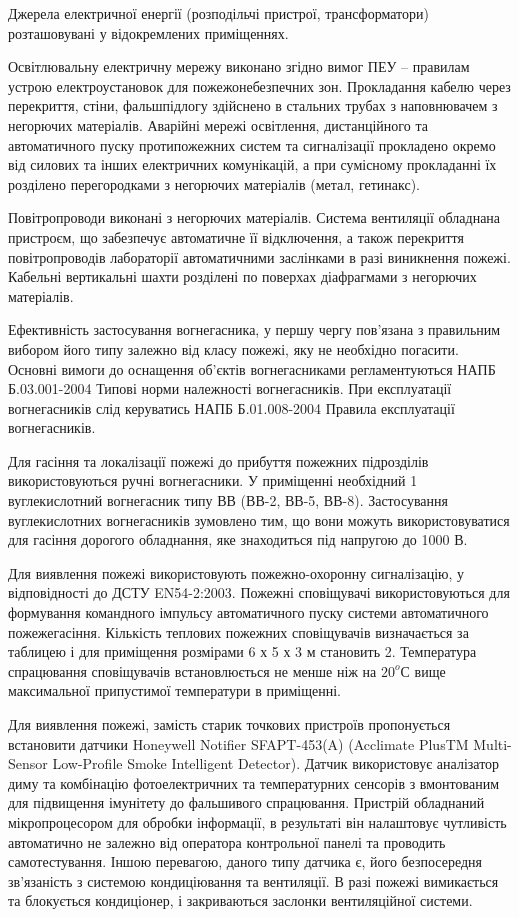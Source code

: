 Джерела електричної енергії (розподільчі пристрої, трансформатори) розташовувані у відокремлених приміщеннях.

Освітлювальну електричну мережу виконано згідно вимог ПЕУ – правилам устрою електроустановок для пожежонебезпечних зон.
Прокладання кабелю через перекриття, стіни, фальшпідлогу здійснено в стальних трубах з наповнювачем з негорючих матеріалів. Аварійні мережі освітлення, дистанційного та автоматичного пуску протипожежних систем та сигналізації 
прокладено окремо від силових та інших електричних комунікацій, а при сумісному прокладанні їх 
розділено перегородками з негорючих матеріалів (метал, гетинакс).


Повітропроводи виконані з негорючих матеріалів. Система вентиляції обладнана пристроєм, що 
забезпечує автоматичне її відключення, а також перекриття повітропроводів лабораторії 
автоматичними заслінками в разі виникнення пожежі. Кабельні вертикальні шахти розділені 
по поверхах діафрагмами з негорючих матеріалів.

Ефективність застосування вогнегасника, у першу чергу пов’язана з правильним вибором його типу залежно від класу пожежі, яку не необхідно погасити. Основні вимоги до оснащення об’єктів вогнегасниками регламентуються НАПБ Б.03.001-2004 Типові норми належності вогнегасників. При експлуатації вогнегасників слід керуватись НАПБ Б.01.008-2004 Правила експлуатації вогнегасників.

Для гасіння та локалізації пожежі до прибуття пожежних підрозділів використовуються ручні вогнегасники.  У приміщенні необхідний 1  вуглекислотний вогнегасник типу ВВ (ВВ-2, ВВ-5, ВВ-8). Застосування вуглекислотних вогнегасників зумовлено тим, що вони можуть використовуватися для гасіння дорогого обладнання, яке знаходиться під напругою до 1000 В. 

Для виявлення пожежі використовують пожежно-охоронну сигналізацію, у відповідності до ДСТУ EN54-2:2003. Пожежні сповіщувачі використовуються для формування командного імпульсу автоматичного пуску системи автоматичного пожежегасіння. Кількість теплових пожежних сповіщувачів визначається за таблицею і для приміщення розмірами 6 х 5 х 3 м становить 2. 
Температура спрацювання сповіщувачів встановлюється не менше ніж на $20^o$С вище 
максимальної припустимої температури в приміщенні.

Для виявлення пожежі, замість старик точкових пристроїв пропонується встановити датчики Honeywell Notifier SFAPT-453(A)
(Acclimate PlusTM Multi-Sensor Low-Profile Smoke Intelligent Detector). Датчик використовує аналізатор диму та комбінацію фотоелектричних та температурних сенсорів з вмонтованим для підвищення імунітету до фальшивого спрацювання. Пристрій обладнаний мікропроцесором для обробки інформації, в результаті він налаштовує чутливість автоматично не залежно від оператора контрольної панелі та проводить самотестування. Іншою перевагою, даного типу датчика є, його безпосередня зв'язаність з системою кондиціювання та вентиляції. В разі пожежі вимикається та блокується кондиціонер,
і закриваються заслонки вентиляційної системи.


